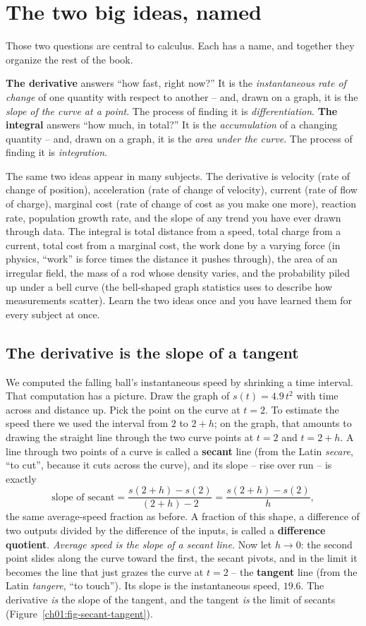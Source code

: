 \section{The two big ideas, named}
Those two questions are central to calculus. Each has a name, and together they organize the rest of the book.
\begin{focusbox}
\textbf{The derivative} answers ``how fast, right now?'' It is the
\emph{instantaneous rate of change} of one quantity with respect to another --
and, drawn on a graph, it is the \emph{slope of the curve at a point}. The
process of finding it is \emph{differentiation}.
\textbf{The integral} answers ``how much, in total?'' It is the
\emph{accumulation} of a changing quantity -- and, drawn on a graph, it is the
\emph{area under the curve}. The process of finding it is \emph{integration}.
\end{focusbox}
The same two ideas appear in many subjects.
The derivative is velocity (rate of change of position), acceleration (rate of
change of velocity), current (rate of flow of charge), marginal cost (rate of
change of cost as you make one more), reaction rate, population growth rate, and
the slope of any trend you have ever drawn through data. The integral is total
distance from a speed, total charge from a current, total cost from a marginal
cost, the work done by a varying force (in physics, ``work'' is force times the
distance it pushes through), the area of an irregular field, the mass
of a rod whose density varies, and the probability piled up under a bell curve
(the bell-shaped graph statistics uses to describe how measurements scatter).
Learn the two ideas once and you have learned them for every subject at once.
\subsection{The derivative is the slope of a tangent}
We computed the falling ball's instantaneous speed by shrinking a time interval.
That computation has a picture. Draw the graph of $s(t)=4.9\,t^2$ with
time across and distance up. Pick the point on the curve at $t = 2$. To estimate
the speed there we used the interval from $2$ to $2+h$; on the graph, that
amounts to drawing the straight line through the two curve points at $t=2$ and
$t=2+h$. A line through two points of a curve is called a \textbf{secant} line
(from the Latin \emph{secare}, ``to cut'', because it cuts across the curve),
and its slope -- rise over run -- is exactly
\[
  \text{slope of secant} = \frac{s(2+h)-s(2)}{(2+h)-2}
  = \frac{s(2+h)-s(2)}{h},
\]
the same average-speed fraction as before. A fraction of this shape, a
difference of two outputs divided by the difference of the inputs, is called a
\textbf{difference quotient}. \emph{Average speed is the slope
of a secant line.} Now let $h \to 0$: the second point slides along the curve
toward the first, the secant pivots, and in the limit it becomes the line that
just grazes the curve at $t = 2$ -- the \textbf{tangent} line (from the Latin
\emph{tangere}, ``to touch''). Its slope is the instantaneous speed, $19.6$.
The derivative \emph{is} the slope of the tangent, and the tangent \emph{is} the
limit of secants (Figure~\ref{ch01:fig-secant-tangent}).

